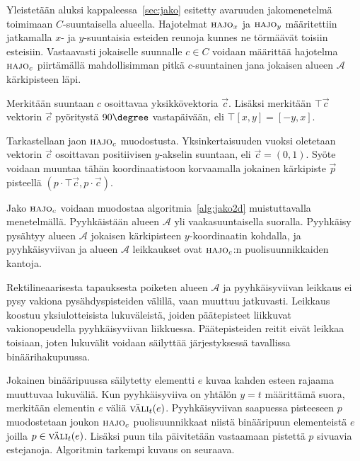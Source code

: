 \documentclass[finnish]{tktltiki2}
\theoremstyle{definition}
\theoremstyle{remark}
\newcommand\fspace{\ensuremath{\mathcal{A}}\xspace}
\newcommand\decomp[1]{\ensuremath{\textsc{hajo}_{#1}}\xspace}
\newcommand\rotr[1]{\ensuremath{\top #1}\xspace}
\newcommand\vecof[1]{\ensuremath{\left [#1\right ]}\xspace}
\newcommand\intert[2]{\ensuremath{\textsc{väli}_{#1}(#2)}\xspace}
\newcommand\point[1]{\ensuremath{\left ({#1}\right )}\xspace}
\begin{document}
Yleistetään aluksi kappaleessa~\ref{sec:jako} esitetty avaruuden jakomenetelmä toimimaan $C$-suuntaisella alueella.
Hajotelmat \decomp{x} ja \decomp{y} määritettiin jatkamalla $x$- ja $y$-suuntaisia esteiden reunoja kunnes ne törmäävät toisiin esteisiin.
Vastaavasti jokaiselle suunnalle $c\in C$ voidaan määrittää hajotelma \decomp{c} piirtämällä mahdollisimman pitkä $c$-suuntainen jana jokaisen alueen \fspace kärkipisteen läpi.

Merkitään suuntaan $c$ osoittavaa yksikkövektoria $\vec{c}$.
Lisäksi merkitään \rotr{\vec{c}} vektorin $\vec{c}$ pyöritystä $90\degree$ vastapäivään, eli $\rotr{\vecof{x,y}}=\vecof{-y,x}$.

Tarkastellaan jaon \decomp{c} muodostusta.
Yksinkertaisuuden vuoksi oletetaan vektorin $\vec{c}$ osoittavan positiivisen $y$-akselin suuntaan, eli $\vec{c}=\point{0,1}$.
Syöte voidaan muuntaa tähän koordinaatistoon korvaamalla jokainen kärkipiste $\vec{p}$ pisteellä $\point{p\cdot\rotr{\vec{c}},p\cdot\vec{c}}$.

Jako \decomp{c} voidaan muodostaa algoritmia~\ref{alg:jako2d} muistuttavalla menetelmällä.
Pyyhkäistään alueen \fspace yli vaakasuuntaisella suoralla.
Pyyhkäisy pysähtyy alueen \fspace jokaisen kärkipisteen $y$-koordinaatin kohdalla, ja pyyhkäisyviivan ja alueen \fspace leikkaukset ovat \decomp{c}:n puolisuunnikkaiden kantoja.

Rektilineaarisesta tapauksesta poiketen alueen \fspace ja pyyhkäisyviivan leikkaus ei pysy vakiona pysähdyspisteiden välillä, vaan muuttuu jatkuvasti.
Leikkaus koostuu yksiulotteisista lukuväleistä, joiden päätepisteet liikkuvat vakionopeudella pyyhkäisyviivan liikkuessa.
Päätepisteiden reitit eivät leikkaa toisiaan, joten lukuvälit voidaan säilyttää järjestyksessä tavallissa binäärihakupuussa.

Jokainen binääripuussa säilytetty elementti $e$ kuvaa kahden esteen rajaama muuttuvaa lukuväliä.
Kun pyyhkäisyviiva on yhtälön $y=t$ määrittämä suora, merkitään elementin $e$ väliä \intert{t}{e}.
Pyyhkäisyviivan saapuessa pisteeseen $p$ muodostetaan joukon \decomp{c} puolisuunnikkaat niistä binääripuun elementeistä $e$ joilla $p\in\intert{t}{e}$.
Lisäksi puun tila päivitetään vastaamaan pistettä $p$ sivuavia estejanoja.
Algoritmin tarkempi kuvaus on seuraava.
\end{document}
